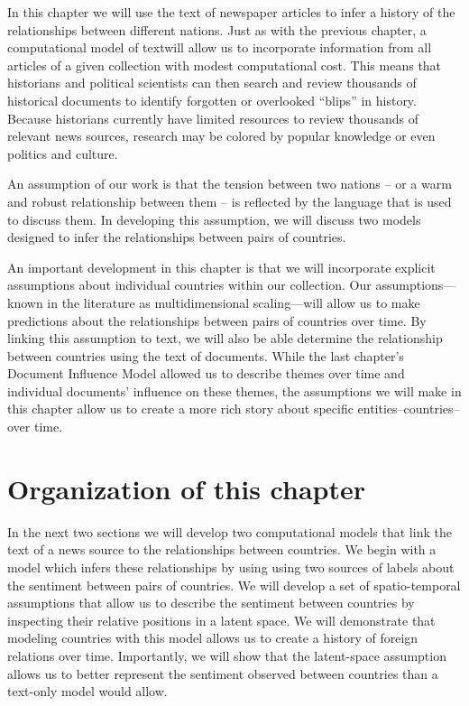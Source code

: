 In this chapter we will use the text of newspaper articles to infer a
history of the relationships between different nations.  Just as with
the previous chapter, a computational model of textwill allow us to
incorporate information from all articles of a given collection with
modest computational cost.  This means that historians and political
scientists can then search and review thousands of historical
documents to identify forgotten or overlooked ``blips'' in history.
Because historians currently have limited resources to review
thousands of relevant news sources, research may be colored by popular
knowledge or even politics and culture.

An assumption of our work is that the tension between two nations --
or a warm and robust relationship between them -- is reflected by the
language that is used to discuss them.  In developing this assumption,
we will discuss two models designed to infer the relationships between
pairs of countries.


An important development in this chapter is that we will incorporate
explicit assumptions about individual countries within our collection.
Our assumptions---known in the literature as multidimensional
scaling---will allow us to make predictions about the relationships
between pairs of countries over time.  By linking this assumption to
text, we will also be able determine the relationship between
countries using the text of documents.  While the last chapter's
Document Influence Model allowed us to describe themes over time and
individual documents' influence on these themes, the assumptions we
will make in this chapter allow us to create a more rich story about
specific entities--countries--over time.



\section{Organization of this chapter}

In the next two sections we will develop two computational models that
link the text of a news source to the relationships between countries.
We begin with a model which infers these relationships by using using
two sources of labels about the sentiment between pairs of countries.
We will develop a set of spatio-temporal assumptions that allow us to
describe the sentiment between countries by inspecting their relative
positions in a latent space.  We will demonstrate that modeling
countries with this model allows us to create a history of foreign
relations over time.  Importantly, we will show that the latent-space
assumption allows us to better represent the sentiment observed
between countries than a text-only model would allow.

